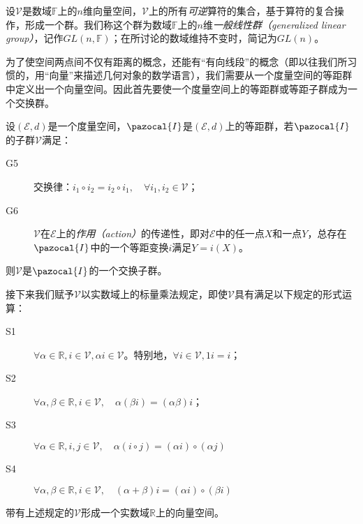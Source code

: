 \documentclass[../main.tex]{subfiles}
\begin{document}
\begin{example}
    设$\mathcal{V}$是数域$\mathbb{F}$上的$n$维向量空间，$\mathcal{V}$上的所有\emph{可逆}算符的集合，基于算符的复合操作，形成一个群。我们称这个群为数域$\mathbb{F}$上的$n$维\emph{一般线性群（generalized linear group）}，记作$GL\left(n,\mathbb{F}\right)$；在所讨论的数域维持不变时，简记为$GL\left(n\right)$。
\end{example}

为了使空间两点间不仅有距离的概念，还能有“有向线段”的概念（即以往我们所习惯的，用“向量”来描述几何对象的数学语言），我们需要从一个度量空间的等距群中定义出一个向量空间。因此首先要使一个度量空间上的等距群或等距子群成为一个交换群。

设$\left(\mathcal{E},d\right)$是一个度量空间，$\pazocal{I}$是$\left(\mathcal{E},d\right)$上的等距群，若$\pazocal{I}$的子群$\mathcal{V}$满足：
\begin{description}
    \item[G5] 交换律：$i_1\circ i_2=i_2\circ i_1,\quad \forall i_1,i_2\in\mathcal{V}$；
    \item[G6] $\mathcal{V}$在$\mathcal{E}$上的\emph{作用（action）}的传递性，即对$\mathcal{E}$中的任一点$X$和一点$Y$，总存在$\pazocal{I}$中的一个等距变换$i$满足$Y=i\left(X\right)$。
\end{description}
则$\mathcal{V}$是$\pazocal{I}$的一个交换子群。

接下来我们赋予$\mathcal{V}$以实数域上的标量乘法规定，即使$\mathcal{V}$具有满足以下规定的形式运算：
\begin{description}
    \item[S1] $\forall\alpha\in\mathbb{R},i\in\mathcal{V},\alpha i\in\mathcal{V}$。特别地，$\forall i\in\mathcal{V},1i=i$；
    \item[S2] $\forall\alpha,\beta\in\mathbb{R},i\in\mathcal{V},\quad\alpha\left(\beta i\right)=\left(\alpha\beta\right)i$；
    \item[S3] $\forall\alpha\in\mathbb{R},i,j\in\mathcal{V},\quad\alpha\left(i\circ j\right)=\left(\alpha i \right)\circ\left(\alpha j\right)$
    \item[S4] $\forall\alpha,\beta\in\mathbb{R},i\in\mathcal{V},\quad\left(\alpha+\beta\right)i=\left(\alpha i\right)\circ\left(\beta i\right)$
\end{description}
带有上述规定的$\mathcal{V}$形成一个实数域$\mathbb{R}$上的向量空间。
\end{document}
